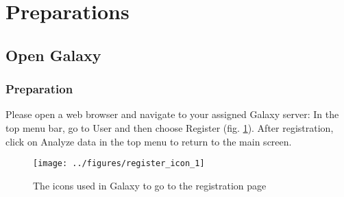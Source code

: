 \section*{Preparations}
\subsection*{Open Galaxy}
\begin{frame}
    \frametitle{Preparation}
Please open a web browser and navigate to your assigned Galaxy server:
\servers
In the top menu bar, go to User and then choose Register (fig. \ref{fig:registration}). After registration, click on Analyze data in the top menu to return to the main screen.
\begin{figure}
 \center
  \texttt{[image: ../figures/register\_icon\_1]}
  \caption{\small{ The icons used in Galaxy to go to the registration page }}
  \label{fig:registration}
\end{figure}
\end{frame}
